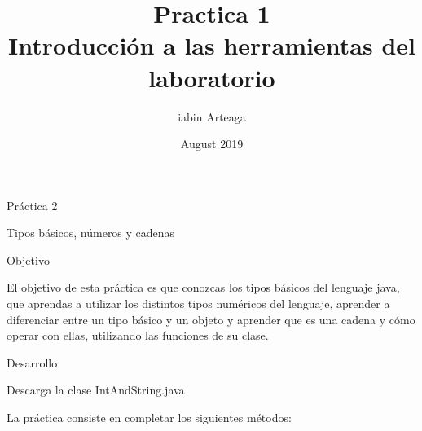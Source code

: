 \documentclass{report}
\title{Practica 1 \\ Introducción a las herramientas del laboratorio}
\author{iabin Arteaga}
\date{August 2019}
\begin{document}
{Práctica 2}

{Tipos básicos, números y cadenas }

{}

{Objetivo}

{El objetivo de esta práctica es que conozcas los tipos básicos del lenguaje java, que aprendas a utilizar los distintos tipos numéricos del lenguaje, aprender a diferenciar entre un tipo básico y un objeto y aprender que es una cadena y cómo operar con ellas, utilizando las funciones de su clase.}

{}

{Desarrollo}

{Descarga la clase IntAndString.java }

{La práctica consiste en completar los siguientes métodos:}

{}

\href{}{}\href{}{}
\end{document}
